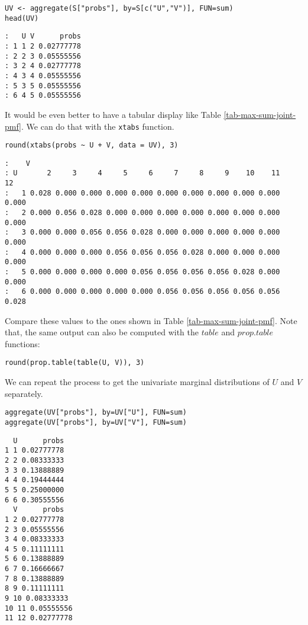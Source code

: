 \begin{Verbatim}
UV <- aggregate(S["probs"], by=S[c("U","V")], FUN=sum)
head(UV)
\end{Verbatim}

\begin{verbatim}
:   U V      probs
: 1 1 2 0.02777778
: 2 2 3 0.05555556
: 3 2 4 0.02777778
: 4 3 4 0.05555556
: 5 3 5 0.05555556
: 6 4 5 0.05555556
\end{verbatim}

It would be even better to have
a tabular display like Table \ref{tab-max-sum-joint-pmf}. We can do that with
the \texttt{xtabs} function.

\begin{Verbatim}
round(xtabs(probs ~ U + V, data = UV), 3)
\end{Verbatim}

\begin{verbatim}
:    V
: U       2     3     4     5     6     7     8     9    10    11    12
:   1 0.028 0.000 0.000 0.000 0.000 0.000 0.000 0.000 0.000 0.000 0.000
:   2 0.000 0.056 0.028 0.000 0.000 0.000 0.000 0.000 0.000 0.000 0.000
:   3 0.000 0.000 0.056 0.056 0.028 0.000 0.000 0.000 0.000 0.000 0.000
:   4 0.000 0.000 0.000 0.056 0.056 0.056 0.028 0.000 0.000 0.000 0.000
:   5 0.000 0.000 0.000 0.000 0.056 0.056 0.056 0.056 0.028 0.000 0.000
:   6 0.000 0.000 0.000 0.000 0.000 0.056 0.056 0.056 0.056 0.056 0.028
\end{verbatim}

Compare these values to the ones shown in Table \ref{tab-max-sum-joint-pmf}.
Note that, the same output can also be computed with the $table$ and $prop.table$ functions:

\begin{Verbatim}
round(prop.table(table(U, V)), 3)
\end{Verbatim}

We can repeat the process to get the univariate marginal
distributions of \(U\) and \(V\) separately.

\begin{Verbatim}
aggregate(UV["probs"], by=UV["U"], FUN=sum)
aggregate(UV["probs"], by=UV["V"], FUN=sum)
\end{Verbatim}

\begin{verbatim}
  U      probs
1 1 0.02777778
2 2 0.08333333
3 3 0.13888889
4 4 0.19444444
5 5 0.25000000
6 6 0.30555556
  V      probs
1 2 0.02777778
2 3 0.05555556
3 4 0.08333333
4 5 0.11111111
5 6 0.13888889
6 7 0.16666667
7 8 0.13888889
8 9 0.11111111
9 10 0.08333333
10 11 0.05555556
11 12 0.02777778
\end{verbatim}

